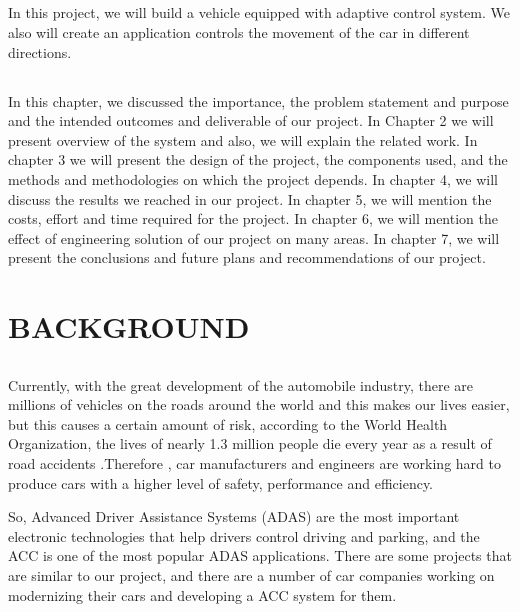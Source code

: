 \documentclass[12pt,a4paper]{report}
\begin{document}
\section{\fontsize{12}{12}\selectfont{Intended Outcomes and Deliverable}}
In this project, we will build a vehicle equipped with adaptive control system. We also will create an application controls  the movement of the car in different directions. 

\section{\fontsize{12}{12}\selectfont{Summary of Report Structure}}
In this chapter, we discussed the importance, the problem statement and purpose and the intended outcomes and deliverable of our project. In Chapter 2 we will present overview of the system and also, we will explain the related work. In chapter 3 we will present the design of the project, the components used, and the methods and methodologies on which the project depends. In chapter 4, we will discuss the results we reached in our project. In chapter 5, we will mention the costs, effort and time required for the project. In chapter 6, we will mention the effect of engineering solution of our project on many areas. In chapter 7, we will present the conclusions and future plans and recommendations of our project.



\chapter{BACKGROUND} 
\section{\fontsize{12}{12}\selectfont{Overview}}

Currently, with the great development of the automobile industry, there are millions of vehicles on the roads around the world and this makes our lives easier, but this causes a certain amount of risk, according to the World Health Organization, the lives of nearly 1.3 million people die every year as a result of road accidents \cite{injuries} .Therefore , car manufacturers and engineers are working hard to produce cars with a higher level of safety, performance and efficiency.

So, Advanced Driver Assistance Systems (ADAS) are the most important electronic technologies that help drivers control driving and parking, and the ACC is one of the most popular ADAS applications.  There are some projects that are similar to our project, and there are a number of car companies working on modernizing their cars and developing a ACC system for them.
\end{document}
